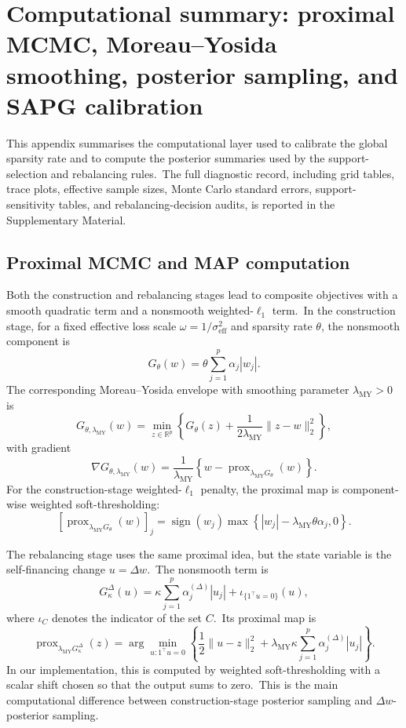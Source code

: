 \documentclass[11pt]{article}
\begin{document}
\section{Computational summary: proximal MCMC, Moreau--Yosida smoothing, posterior sampling, and SAPG calibration}
\label{app:computational-summary}

This appendix summarises the computational layer used to calibrate the global sparsity rate and to compute the posterior summaries used by the support-selection and rebalancing rules.\ The full diagnostic record, including grid tables, trace plots, effective sample sizes, Monte Carlo standard errors, support-sensitivity tables, and rebalancing-decision audits, is reported in the Supplementary Material.

\subsection{Proximal MCMC and MAP computation}
\label{app:proximal-summary}

Both the construction and rebalancing stages lead to composite objectives with a smooth quadratic term and a nonsmooth weighted-\(\ell_1\) term.\ In the construction stage, for a fixed effective loss scale \(\omega=1/\sigma_{\mathrm{eff}}^2\) and sparsity rate \(\theta\), the nonsmooth component is
\[
G_\theta(w)
=
\theta \sum_{j=1}^p \alpha_j |w_j|.
\]
The corresponding Moreau--Yosida envelope with smoothing parameter \mbox{\(\lambda_{\mathrm{MY}}>0\)} is
\[
G_{\theta,\lambda_{\mathrm{MY}}}(w)
=
\min_{z\in\mathbb{R}^p}
\left\{
G_\theta(z)
+
\frac{1}{2\lambda_{\mathrm{MY}}}\|z-w\|_2^2
\right\},
\]
with gradient
\[
\nabla G_{\theta,\lambda_{\mathrm{MY}}}(w)
=
\frac{1}{\lambda_{\mathrm{MY}}}
\left\{
w-\operatorname{prox}_{\lambda_{\mathrm{MY}}G_\theta}(w)
\right\}.
\]
For the construction-stage weighted-\(\ell_1\) penalty, the proximal map is component-wise weighted soft-thresholding:
\[
\left[
\operatorname{prox}_{\lambda_{\mathrm{MY}}G_\theta}(w)
\right]_j
=
\operatorname{sign}(w_j)
\max\left\{
|w_j|-\lambda_{\mathrm{MY}}\theta\alpha_j,0
\right\}.
\]

The rebalancing stage uses the same proximal idea, but the state variable is the self-financing change \(u=\Delta w\).\ The nonsmooth term is
\[
G_{\kappa}^{\Delta}(u)
=
\kappa \sum_{j=1}^p \alpha^{(\Delta)}_j |u_j|
+
\iota_{\{1^\top u=0\}}(u),
\]
where \(\iota_C\) denotes the indicator of the set \(C\).\ Its proximal map is
\[
\operatorname{prox}_{\lambda_{\mathrm{MY}}G_\kappa^\Delta}(z)
=
\arg\min_{u:1^\top u=0}
\left\{
\frac12\|u-z\|_2^2
+
\lambda_{\mathrm{MY}}\kappa
\sum_{j=1}^p \alpha_j^{(\Delta)}|u_j|
\right\}.
\]
In our implementation, this is computed by weighted soft-thresholding with a scalar shift chosen so that the output sums to zero.\ This is the main computational difference between construction-stage posterior sampling and \(\Delta w\)-posterior sampling.
\end{document}
